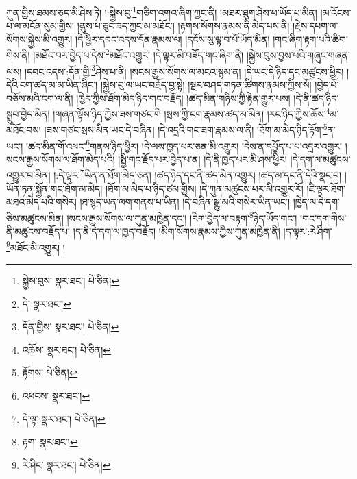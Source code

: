 ཀུན་གྱིས་ཐམས་ཅད་མི་ཤེས་ཏེ། །:སྐྱེས་བུ་\footnote{སྐྱེས་བུས་  སྣར་ཐང་།  པེ་ཅིན། }གཅིག་འགའ་ཞིག་ཀྱང་ནི། །མཐར་ཐུག་ཤེས་པ་ཡོད་པ་མིན། །མ་འོངས་པ་ལ་མངོན་སུམ་གྱིས། །ནུས་པ་ཅུང་ཟད་ཀྱང་མ་མཐོང་། །རྟགས་སོགས་རྣམས་ནི་མེད་པས་ནི། །རྗེས་དཔག་ལ་སོགས་སྐྱེས་མི་འགྱུར། །དེ་ཕྱིར་དབང་འདས་དོན་རྣམས་ལ། །དངོས་སུ་ལྟ་བ་པོ་ཡོད་མིན། །གང་ཞིག་རྟག་པའི་ཚིག་གིས་ནི། །མཐོང་བར་བྱེད་པ་དེས་\footnote{དེ་  སྣར་ཐང་། }མཐོང་འགྱུར། །དེ་ལྟར་མི་བཟོད་གང་ཞིག་ནི། །སྐྱེས་བུས་བྱས་པའི་གཞུང་གཞན་ལས། །དབང་འདས་:དོན་གྱི་\footnote{དོན་གྱིས་  སྣར་ཐང་།  པེ་ཅིན། }ཤེས་པ་ནི། །སངས་རྒྱས་སོགས་ལ་མངའ་སྙམ་ན། །དེ་ཡང་དེ་ཉིད་དང་མཚུངས་ཕྱིར། །དེའི་ངག་ཚད་མ་མ་ཡིན་ཞིང་། །སྐྱེས་བུ་ལ་ཡང་བརྗོད་བྱ་སྟེ། །སྔར་བཤད་གཏན་ཚིགས་རྣམས་ཀྱིས་སོ། །བྱེད་པོ་བཅོས་མའི་ངག་ལ་ནི། །ཁྱེད་ཀྱིས་ཐོག་མེད་ཉིད་གང་བརྗོད། །ཚད་མིན་གཉིས་ཀྱི་རྟེན་གྱུར་པས། །དེ་ནི་ཚད་ཉིད་སྒྲུབ་བྱེད་མིན། །གཞན་ལྟོས་ཉིད་ཀྱིས་ཟས་གཙང་གི །སྲས་ཀྱི་ངག་རྣམས་ཚད་མ་མིན། །རང་ཉིད་ཀྱིས་ཆོས་\footnote{འཆོས་  སྣར་ཐང་།  པེ་ཅིན། }མ་མཐོང་བས། །ཟས་གཙང་སྲས་མིན་ཡང་དེ་བཞིན། །དེ་འདྲའི་གང་ཟག་རྣམས་ལ་ནི། །ཐོག་མ་མེད་ཉིད་རྟོག་\footnote{རྟོགས་  པེ་ཅིན། }ན་ཡང་། །ཚད་མིན་གོ་འཕང་\footnote{འཕངས་  སྣར་ཐང་། }གནས་ཉིད་ཕྱིར། །དེ་ལས་ཁྱད་པར་ཅན་མི་འགྱུར། །དེས་ན་དཔྱོད་པ་པ་འདྲར་འགྱུར། །སངས་རྒྱས་སོགས་ལ་ཐོག་མེད་པའི། །སྤྱི་གང་རྗོད་པར་བྱེད་པ་ན། །དེ་ནི་ཁྱད་པར་མི་ཤས་ཕྱིར། །དེ་དག་ལ་མཚུངས་འགྱུར་བ་མིན། །:དེ་ལྟར་\footnote{དེ་ལྟ་  སྣར་ཐང་།  པེ་ཅིན། }ཡིན་ན་ཐོག་མེད་ཅན། །ཚད་ཉིད་དང་ནི་ཚད་མིན་འགྱུར། །ཚད་མ་དང་ནི་དེའི་སྣང་བ། །ཡོན་ཏན་སྐྱོན་གང་ཐོག་མ་མེད། །ཐོག་མ་མེད་པ་ཉིད་ཙམ་གྱིས། །དེ་ཀུན་མཚུངས་པར་མི་འགྱུར་རོ། །ཇི་ལྟར་ཐོག་མཐའ་མེད་པའི་གསེར། །ཐ་སྙད་ཡན་ལག་གནས་པ་ཡིན། །དེ་བཞིན་སྒྱུ་མའི་གསེར་ཡིན་ཡང་། །ཁྱེད་ལ་དེ་དག་ཅིས་མཚུངས་མིན། །སངས་རྒྱས་སོགས་ལ་ཀུན་མཁྱེན་དང་། །རིག་བྱེད་ལ་བརྟག་\footnote{རྟག་  སྣར་ཐང་། }ཉིད་ཡོད་གང་། །གང་དག་གིས་ནི་མཚུངས་བརྗོད་པ། །ད་ནི་དེ་དག་ལ་ཁྱད་བརྗོད། །མིག་སོགས་རྣམས་ཀྱིས་ཀུན་མཁྱེན་ནི། །ད་ལྟར་:རེ་ཤིག་\footnote{རེ་ཤིང་  སྣར་ཐང་།  པེ་ཅིན། }མཐོང་མི་འགྱུར། །
